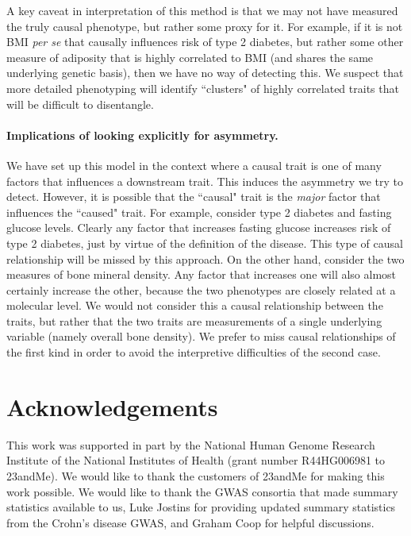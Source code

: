 \documentclass[11pt,titlepage]{article}
\begin{document}
A key caveat in interpretation of this method is that we may not have measured the truly causal phenotype, but rather some proxy for it. For example, if it is not BMI \emph{per se} that causally influences risk of type 2 diabetes, but rather some other measure of adiposity that is highly correlated to BMI (and shares the same underlying genetic basis), then we have no way of detecting this. We suspect that more detailed phenotyping will identify ``clusters" of highly correlated traits that will be difficult to disentangle.  

\paragraph{Implications of looking explicitly for asymmetry.}

We have set up this model in the context where a causal trait is one of many factors that influences a downstream trait. This induces the asymmetry we try to detect. However, it is possible that the ``causal" trait is the \emph{major} factor that influences the ``caused" trait. For example, consider type 2 diabetes and fasting glucose levels. Clearly any factor that increases fasting glucose increases risk of type 2 diabetes, just by virtue of the definition of the disease. This type of causal relationship will be missed by this approach. On the other hand, consider the two measures of bone mineral density. Any factor that increases one will also almost certainly increase the other, because the two phenotypes are closely related at a molecular level. We would not consider this a causal relationship between the traits, but rather that the two traits are measurements of a single underlying variable (namely overall bone density). We prefer to miss causal relationships of the first kind in order to avoid the interpretive difficulties of the second case.
\section{Acknowledgements}
This work was supported in part by the National Human Genome Research Institute of the National Institutes of Health (grant number R44HG006981 to 23andMe). We would like to thank the customers of 23andMe for making this work possible. We would like to thank the GWAS consortia that made summary statistics available to us, Luke Jostins for providing updated summary statistics from the Crohn's disease GWAS, and Graham Coop for helpful discussions.


\end{document}
